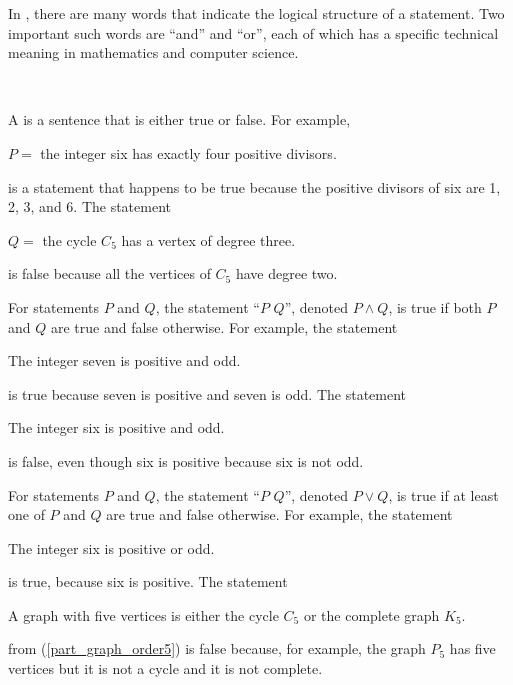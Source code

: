 In , there are many words that indicate the logical structure of a statement.  Two important such words are ``and'' and ``or'', each of which has a specific technical meaning in mathematics and computer science.

\begin{defn}
\label{defn_and_or_xor}
~
    \begin{apart}
        \item A  is a sentence that is either true or false.  For example,
            \begin{center}
                $P=$ the integer six has exactly four positive divisors.
            \end{center}
        is a statement that happens to be true because the positive divisors of six are 1, 2, 3, and 6.  The statement
            \begin{center}
                $Q=$ the cycle $C_5$ has a vertex of degree three.   
            \end{center} 
        is false because all the vertices of $C_5$ have degree two.
        
        \item For statements $P$ and $Q$, the statement ``$P$  $Q$'', denoted $P \land Q$, is true if both $P$ and $Q$ are true and false otherwise.  For example, the statement  
            \begin{center}
                The integer seven is positive and odd.    
            \end{center}
        is true because seven is positive and seven is odd. The statement 
            \begin{center}
                The integer six is positive and odd.   
            \end{center} 
        is false, even though six is positive because six is not odd.
        
        \item For statements $P$ and $Q$, the statement ``$P$  $Q$'', denoted $P \lor Q$, is true if at least one of $P$ and $Q$ are true and false otherwise.  For example, the statement
            \begin{center}
                The integer six is positive or odd.
            \end{center}
        is true, because six is positive.  The statement 
            \begin{center}
                A graph with five vertices is either the cycle $C_5$ or the complete graph $K_5$.
            \end{center}
        from  (\ref{part_graph_order5}) is false because, for example, the graph $P_5$ has five vertices but it is not a cycle and it is not complete.  
        

\end{apart}
\end{defn}
